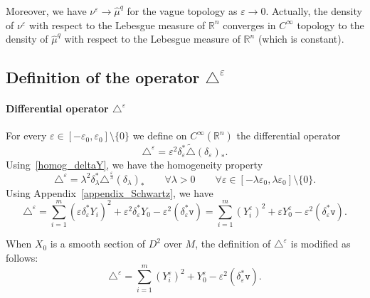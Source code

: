 \documentclass[10pt]{amsart}
\theoremstyle{definition}\newtheorem{defi}[theo]{Definition}\newtheorem{rema}[theo]{Remark}\newtheorem{exam}[theo]{Example}\newtheorem{exem}[theo]{Example}\newtheorem{nota}[theo]{Notation}
\newcommand*\R{\mathbb{R}}
\newcommand{\ttv}{\mathtt{v}}
\let\oldforall\forall
\renewcommand*{\forall}{\mathrel{\oldforall}}
\begin{document}
Moreover, we have $\nu^\varepsilon\rightarrow \widehat{\mu}^{q}$ for the vague topology as $\varepsilon\rightarrow 0$. Actually, the density of $\nu^\varepsilon$ with respect to the Lebesgue measure of $\R^n$ converges in $C^\infty$ topology to the density of $\widehat{\mu}^{q}$ with respect to the Lebesgue measure of $\R^n$ (which is constant).


\subsection{Definition of the operator \texorpdfstring{$\triangle^\varepsilon$}{triangle varepsilon}}

\goodbreak
\paragraph{Differential operator $\triangle^\varepsilon$} For every $\varepsilon\in[-\varepsilon_0,\varepsilon_0]\setminus\{0\}$ we define on $C^\infty(\R^n)$ the differential operator
\begin{equation}\label{def_triangleepsilon}
\triangle^\varepsilon = \varepsilon^2 \delta_\varepsilon^* \widetilde\triangle (\delta_\varepsilon)_*.
\end{equation}
Using~\eqref{homog_deltaY}, we have the homogeneity property
\begin{equation}\label{homog_deltaeps}
\triangle^\varepsilon = \lambda^2 \delta_\lambda^* \triangle^{\frac{\varepsilon}{\lambda}} (\delta_\lambda)_* \qquad \forall\lambda>0\qquad\forall\varepsilon\in[-\lambda\varepsilon_0,\lambda\varepsilon_0]\setminus\{0\}.
\end{equation}
Using Appendix~\ref{appendix_Schwartz}, we have
\begin{equation}\label{formula_Deltaeps}
\triangle^\varepsilon =
\sum_{i=1}^m \left(\varepsilon\delta_\varepsilon^*Y_i \right)^2 + \varepsilon^2\delta_\varepsilon^* Y_0 - \varepsilon^2 \left(\delta_\varepsilon^*\ttv \right) = \sum_{i=1}^m \left(Y^\varepsilon_i \right)^2 + \varepsilon Y^\varepsilon_0 - \varepsilon^2 \left(\delta_\varepsilon^*\ttv\right).
\end{equation}

When $X_0$ is a smooth section of $D^2$ over $M$, the definition of $\triangle^\varepsilon$ is modified as follows:
\[
\triangle^\varepsilon = \sum_{i=1}^m \left(Y^\varepsilon_i \right)^2 + Y^\varepsilon_0 - \varepsilon^2 \left(\delta_\varepsilon^*\ttv\right).
\]

\goodbreak
\end{document}
